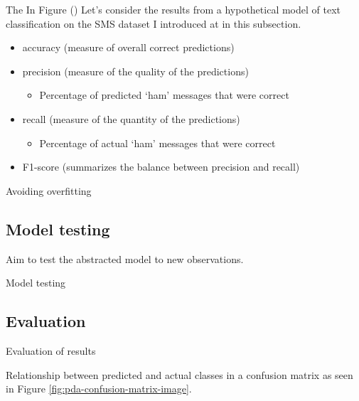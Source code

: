 \documentclass[
]{article}
\providecommand{\tightlist}{%
  \setlength{\itemsep}{0pt}\setlength{\parskip}{0pt}}
\begin{document}
The In Figure () Let's consider the results from a hypothetical model of text classification on the SMS dataset I introduced at in this subsection.

\begin{itemize}
\tightlist
\item
  accuracy (measure of overall correct predictions)
\item
  precision (measure of the quality of the predictions)

  \begin{itemize}
  \tightlist
  \item
    Percentage of predicted `ham' messages that were correct
  \end{itemize}
\item
  recall (measure of the quantity of the predictions)

  \begin{itemize}
  \tightlist
  \item
    Percentage of actual `ham' messages that were correct
  \end{itemize}
\item
  F1-score (summarizes the balance between precision and recall)
\end{itemize}

Avoiding overfitting

\hypertarget{model-testing}{%
\subsection{Model testing}\label{model-testing}}

Aim to test the abstracted model to new observations.

Model testing

\hypertarget{evaluation}{%
\subsection{Evaluation}\label{evaluation}}

Evaluation of results

Relationship between predicted and actual classes in a confusion matrix as seen in Figure \ref{fig:pda-confusion-matrix-image}.
\end{document}
